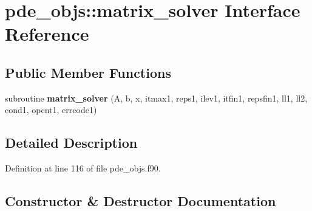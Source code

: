 \section{pde\+\_\+objs\+:\+:matrix\+\_\+solver Interface Reference}
\label{interfacepde__objs_1_1matrix__solver}
\subsection*{Public Member Functions}
\begin{DoxyCompactItemize}
\item 
subroutine {\bf matrix\+\_\+solver} (A, b, x, itmax1, reps1, ilev1, itfin1, repsfin1, ll1, ll2, cond1, opcnt1, errcode1)
\end{DoxyCompactItemize}


\subsection{Detailed Description}


Definition at line 116 of file pde\+\_\+objs.\+f90.



\subsection{Constructor \& Destructor Documentation}
